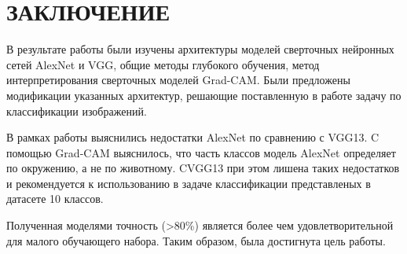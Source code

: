 \section*{ЗАКЛЮЧЕНИЕ}

В результате работы были изучены архитектуры моделей сверточных нейронных сетей AlexNet и VGG, общие методы глубокого обучения, метод интерпретирования сверточных моделей Grad-CAM.
Были предложены модификации указанных архитектур, решающие поставленную в работе задачу по классификации изображений.

В рамках работы выяснились недостатки AlexNet по сравнению с VGG13.
C помощью Grad-CAM выяснилось, что часть классов модель AlexNet определяет по окружению, а не по животному.
CVGG13 при этом лишена таких недостатков и рекомендуется к использованию в задаче классификации представленых в датасете 10 классов.

Полученная моделями точность (>80\%) является более чем удовлетворительной для малого обучающего набора. Таким образом, была достигнута цель работы.